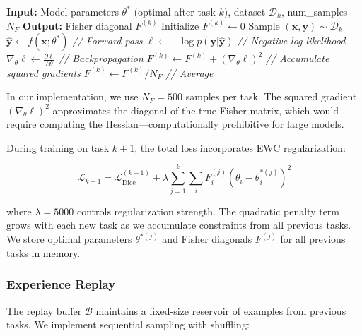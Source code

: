 \documentclass[conference]{IEEEtran}
\begin{document}
\begin{algorithm}[h]
\caption{Fisher Information Computation}
\begin{algorithmic}
\STATE \textbf{Input:} Model parameters $\theta^*$ (optimal after task $k$), dataset $\mathcal{D}_k$, num\_samples $N_F$
\STATE \textbf{Output:} Fisher diagonal $F^{(k)}$
\STATE Initialize $F^{(k)} \leftarrow 0$
    \STATE Sample $(\mathbf{x}, \mathbf{y}) \sim \mathcal{D}_k$
    \STATE $\hat{\mathbf{y}} \leftarrow f(\mathbf{x}; \theta^*)$ \quad \textit{// Forward pass}
    \STATE $\ell \leftarrow -\log p(\mathbf{y} | \hat{\mathbf{y}})$ \quad \textit{// Negative log-likelihood}
    \STATE $\nabla_{\theta} \ell \leftarrow \frac{\partial \ell}{\partial \theta}$ \quad \textit{// Backpropagation}
    \STATE $F^{(k)} \leftarrow F^{(k)} + (\nabla_{\theta} \ell)^2$ \quad \textit{// Accumulate squared gradients}
\ENDFOR
\STATE $F^{(k)} \leftarrow F^{(k)} / N_F$ \quad \textit{// Average}
\end{algorithmic}
\end{algorithm}

In our implementation, we use $N_F = 500$ samples per task. The squared gradient $(\nabla_{\theta} \ell)^2$ approximates the diagonal of the true Fisher matrix, which would require computing the Hessian—computationally prohibitive for large models.

During training on task $k+1$, the total loss incorporates EWC regularization:

\begin{equation}
\mathcal{L}_{k+1} = \mathcal{L}_{\text{Dice}}^{(k+1)} + \lambda \sum_{j=1}^{k} \sum_i F_i^{(j)} (\theta_i - \theta_i^{*(j)})^2
\end{equation}

where $\lambda=5000$ controls regularization strength. The quadratic penalty term grows with each new task as we accumulate constraints from all previous tasks. We store optimal parameters $\theta^{*(j)}$ and Fisher diagonals $F^{(j)}$ for all previous tasks in memory.

\subsubsection{Experience Replay}

The replay buffer $\mathcal{B}$ maintains a fixed-size reservoir of examples from previous tasks. We implement sequential sampling with shuffling:
\end{document}

